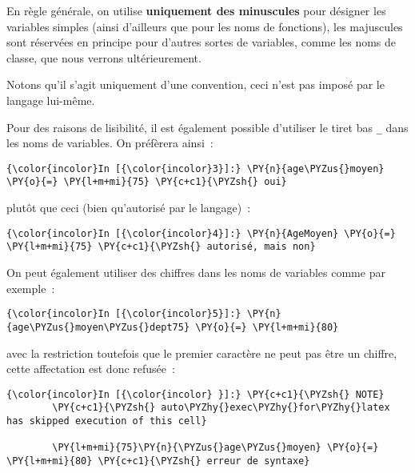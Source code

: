     En règle générale, on utilise \textbf{uniquement des minuscules} pour
désigner les variables simples (ainsi d'ailleurs que pour les noms de
fonctions), les majuscules sont réservées en principe pour d'autres
sortes de variables, comme les noms de classe, que nous verrons
ultérieurement.

Notons qu'il s'agit uniquement d'une convention, ceci n'est pas imposé
par le langage lui-même.

    Pour des raisons de lisibilité, il est également possible d'utiliser le
tiret bas \texttt{\_} dans les noms de variables. On préfèrera ainsi~:

    \begin{Verbatim}[commandchars=\\\{\},frame=single,framerule=0.3mm,rulecolor=\color{cellframecolor}]
{\color{incolor}In [{\color{incolor}3}]:} \PY{n}{age\PYZus{}moyen} \PY{o}{=} \PY{l+m+mi}{75} \PY{c+c1}{\PYZsh{} oui}
\end{Verbatim}


    plutôt que ceci (bien qu'autorisé par le langage)~:

    \begin{Verbatim}[commandchars=\\\{\},frame=single,framerule=0.3mm,rulecolor=\color{cellframecolor}]
{\color{incolor}In [{\color{incolor}4}]:} \PY{n}{AgeMoyen} \PY{o}{=} \PY{l+m+mi}{75} \PY{c+c1}{\PYZsh{} autorisé, mais non}
\end{Verbatim}


    On peut également utiliser des chiffres dans les noms de variables comme
par exemple~:

    \begin{Verbatim}[commandchars=\\\{\},frame=single,framerule=0.3mm,rulecolor=\color{cellframecolor}]
{\color{incolor}In [{\color{incolor}5}]:} \PY{n}{age\PYZus{}moyen\PYZus{}dept75} \PY{o}{=} \PY{l+m+mi}{80}
\end{Verbatim}


    avec la restriction toutefois que le premier caractère ne peut pas être
un chiffre, cette affectation est donc refusée~:

    \begin{Verbatim}[commandchars=\\\{\},frame=single,framerule=0.3mm,rulecolor=\color{cellframecolor}]
{\color{incolor}In [{\color{incolor} }]:} \PY{c+c1}{\PYZsh{} NOTE}
        \PY{c+c1}{\PYZsh{} auto\PYZhy{}exec\PYZhy{}for\PYZhy{}latex has skipped execution of this cell}
        
        \PY{l+m+mi}{75}\PY{n}{\PYZus{}age\PYZus{}moyen} \PY{o}{=} \PY{l+m+mi}{80} \PY{c+c1}{\PYZsh{} erreur de syntaxe}
\end{Verbatim}


